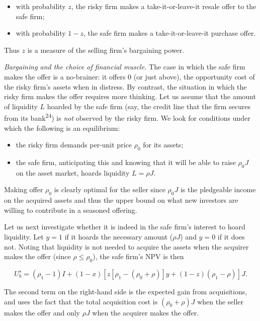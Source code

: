 \documentclass[11pt,a4paper]{article}
\providecommand{\tightlist}{\setlength{\itemsep}{0pt}\setlength{\parskip}{0pt}}
\begin{document}
\begin{itemize}
\tightlist
\item
  with probability \(z\), the risky firm makes a take-it-or-leave-it resale offer to the safe firm;
\item
  with probability \(1 - z\), the safe firm makes a take-it-or-leave-it purchase offer.
\end{itemize}

Thus \(z\) is a measure of the selling firm's bargaining power.

\emph{Bargaining and the choice of financial muscle.} The case in which the safe firm makes the
offer is a no-brainer: it offers 0 (or just above), the opportunity cost of the risky firm's assets
when in distress. By contrast, the situation in which the risky firm makes the offer requires more
thinking. Let us assume that the amount of liquidity \(L\) hoarded by the safe firm (say, the credit
line that the firm secures from its bank\textsuperscript{24}) is \emph{not} observed by the risky
firm. We look for conditions under which the following is an equilibrium:

\begin{itemize}
\tightlist
\item
  the risky firm demands per-unit price \(\rho_0\) for its assets;
\item
  the safe firm, anticipating this and knowing that it will be able to raise \(\rho_0 J\) on the
  asset market, hoards liquidity \(L = \rho J\).
\end{itemize}

Making offer \(\rho_0\) is clearly optimal for the seller since \(\rho_0 J\) is the pledgeable
income on the acquired assets and thus the upper bound on what new investors are willing to
contribute in a seasoned offering.

Let us next investigate whether it is indeed in the safe firm's interest to hoard liquidity. Let
\(y = 1\) if it hoards the necessary amount (\(\rho J\)) and \(y = 0\) if it does not. Noting that
liquidity is not needed to acquire the assets when the acquirer makes the offer (since
\(\rho \leqslant \rho_0\)), the safe firm's NPV is then

\[U_b^s = (\rho_1 - 1)I + (1 - x)[z[\rho_1 - (\rho_0 + \rho)]y + (1 - z)(\rho_1 - \rho)]J.\]

The second term on the right-hand side is the expected gain from acquisitions, and uses the fact
that the total acquisition cost is \((\rho_0 + \rho)J\) when the seller makes the offer and only
\(\rho J\) when the acquirer makes the offer.
\end{document}
